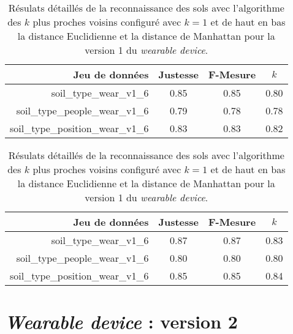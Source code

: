 \begin{table}[H]\renewcommand{\arraystretch}{0.5}
	\centering
	\caption{Résulats détaillés de la reconnaissance des sols avec l'algorithme des $k$ plus proches voisins configuré avec $k=1$ et de haut en bas la distance Euclidienne et la distance de Manhattan pour la version 1 du \textit{wearable device}.}
	\label{tab:knn-wear-v1}
	\begin{tabular}{@{}rccc@{}}
		\toprule
			\textbf{Jeu de données} & \textbf{Justesse} & \textbf{F-Mesure} & \textbf{$k$} \\
		\midrule
			soil\_type\_wear\_v1\_6 & 0.85 & 0.85 & 0.80 \\
			soil\_type\_people\_wear\_v1\_6 & 0.79 & 0.78 & 0.78 \\
			soil\_type\_position\_wear\_v1\_6 & 0.83 & 0.83 & 0.82 \\
	\end{tabular}
	\begin{tabular}{@{}rccc@{}}
		\toprule
			\textbf{Jeu de données} & \textbf{Justesse} & \textbf{F-Mesure} & \textbf{$k$} \\
		\midrule
			soil\_type\_wear\_v1\_6 & 0.87 & 0.87 & 0.83 \\
			soil\_type\_people\_wear\_v1\_6 & 0.80 & 0.80 & 0.80 \\
			soil\_type\_position\_wear\_v1\_6 & 0.85 & 0.85 & 0.84 \\
		\bottomrule
	\end{tabular}
\end{table}

\section{\textit{Wearable device} : version 2}

